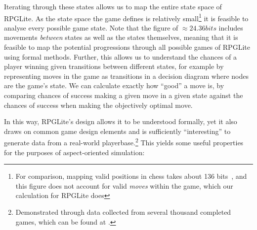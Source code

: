 Iterating through these states allows us to map the entire state space of
RPGLite. As the state space the game defines is relatively small\footnote{For
comparison, mapping valid positions in chess takes about 136
bits~\cite{information_content_chess}, and this figure does not account for
valid \emph{moves} within the game, which our calculation for RPGLite does} 
it is feasible to analyse every possible game state. Note that the figure of
\(\approx 24.36 bits\) includes movements \emph{between} states as well as the
states themselves, meaning that it is feasible to map the potential progressions
through all possible games of RPGLite using formal methods. Further, this allows
us to understand the chances of a player winning given transitions between
different states, for example by representing moves in the game as transitions
in a decision diagram where nodes are the game's state. We can calculate exactly
how ``good'' a move is, by comparing chances of success making a given move in a
given state against the chances of success when making the objectively optimal
move.

In this way, RPGLite's design allows it to be understood formally, yet it also
draws on common game design elements and is sufficiently ``interesting'' to
generate data from a real-world playerbase.\footnote{Demonstrated through data
collected from several thousand completed games, which can be found at
\cite{rpglite_dataset}.} This yields some useful properties for the purposes of
aspect-oriented simulation:

